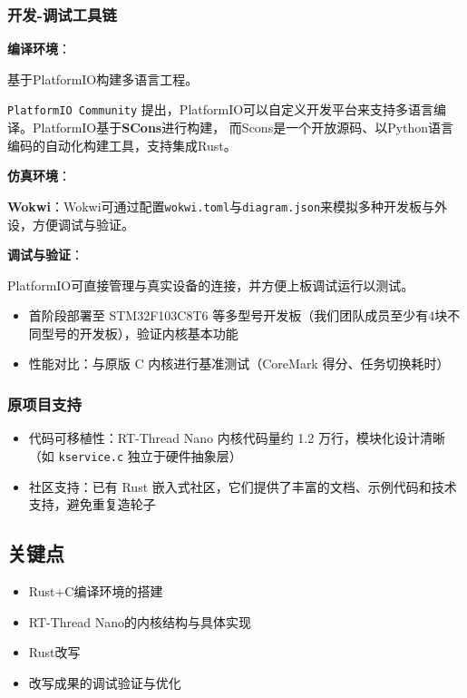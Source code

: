 \subsubsection{开发-调试工具链}

\textbf{编译环境}：

基于PlatformIO构建多语言工程。

{\texttt{PlatformIO Community}} 提出，PlatformIO可以自定义开发平台来支持多语言编译\cite{Kasbah_2016}。PlatformIO基于\textbf{SCons}\cite{PlatformIO_2025}进行构建，
而Scons是一个开放源码、以Python语言编码的自动化构建工具，支持集成Rust\cite{SCons}。

\textbf{仿真环境}：

\textbf{Wokwi}：Wokwi可通过配置\texttt{wokwi.toml}与\texttt{diagram.json}来模拟多种开发板与外设，方便调试与验证。\cite{Wokwi}

\textbf{调试与验证}：

PlatformIO可直接管理与真实设备的连接，并方便上板调试运行以测试。
\begin{itemize}
    \item 首阶段部署至 STM32F103C8T6 等多型号开发板（我们团队成员至少有4块不同型号的开发板），验证内核基本功能
    \item 性能对比：与原版 C 内核进行基准测试（CoreMark 得分、任务切换耗时）
\end{itemize}

\subsubsection{原项目支持}

\begin{itemize}
    \item 代码可移植性：RT-Thread Nano 内核代码量约 1.2 万行，模块化设计清晰（如 \texttt{kservice.c} 独立于硬件抽象层）\cite{RTThreadDoc}
    \item 社区支持：已有 Rust 嵌入式社区\cite{RustEmbedded}\cite{RustEmbeddedHal}，它们提供了丰富的文档、示例代码和技术支持，避免重复造轮子
\end{itemize}

\subsection{关键点}

\begin{itemize}
    \item Rust+C编译环境的搭建
    \item RT-Thread Nano的内核结构与具体实现
    \item Rust改写
    \item 改写成果的调试验证与优化
\end{itemize}

